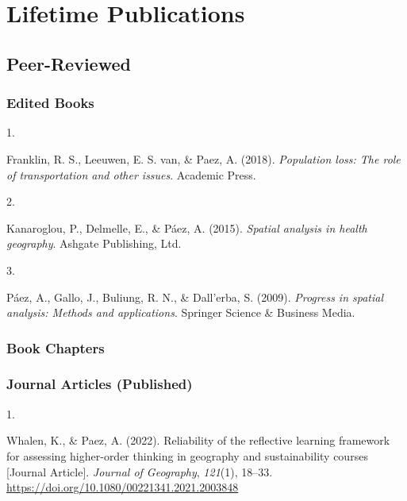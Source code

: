 \documentclass[10pt,a4paper,]{twentysecondcv}
\newlength{\csllabelwidth}
\newcommand{\CSLLeftMargin}[1]{\parbox[t]{\csllabelwidth}{#1}}
\newcommand{\CSLRightInline}[1]{\parbox[t]{\linewidth - \csllabelwidth}{#1}}
\begin{document}
\hypertarget{lifetime-publications}{%
\section{Lifetime Publications}\label{lifetime-publications}}

\hypertarget{peer-reviewed}{%
\subsection{Peer-Reviewed}\label{peer-reviewed}}

\hypertarget{edited-books}{%
\subsubsection{Edited Books}\label{edited-books}}

\hypertarget{bibliography}{}
\leavevmode{}%
\CSLLeftMargin{1. }%
\CSLRightInline{Franklin, R. S., Leeuwen, E. S. van, \& Paez, A. (2018).
\emph{Population loss: The role of transportation and other issues}.
Academic Press.}

\leavevmode{}%
\CSLLeftMargin{2. }%
\CSLRightInline{Kanaroglou, P., Delmelle, E., \& Páez, A. (2015).
\emph{Spatial analysis in health geography}. Ashgate Publishing, Ltd.}

\leavevmode{}%
\CSLLeftMargin{3. }%
\CSLRightInline{Páez, A., Gallo, J., Buliung, R. N., \& Dall'erba, S.
(2009). \emph{Progress in spatial analysis: Methods and applications}.
Springer Science \& Business Media.}

\hypertarget{book-chapters}{%
\subsubsection{Book Chapters}\label{book-chapters}}

\hypertarget{journal-articles-published}{%
\subsubsection{Journal Articles
(Published)}\label{journal-articles-published}}

\hypertarget{bibliography}{}
\leavevmode{}%
\CSLLeftMargin{1. }%
\CSLRightInline{Whalen, K., \& Paez, A. (2022). Reliability of the
reflective learning framework for assessing higher-order thinking in
geography and sustainability courses {[}Journal Article{]}.
\emph{Journal of Geography}, \emph{121}(1), 18--33.
\url{https://doi.org/10.1080/00221341.2021.2003848}}
\end{document}
